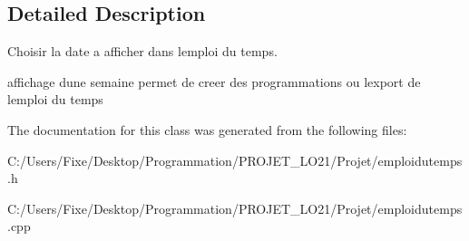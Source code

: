 \subsection{Detailed Description}
Choisir la date a afficher dans l\textquotesingle{}emploi du temps. 

affichage d\textquotesingle{}une semaine permet de creer des programmations ou l\textquotesingle{}export de l\textquotesingle{}emploi du temps 

The documentation for this class was generated from the following files\+:\begin{DoxyCompactItemize}
\item 
C\+:/\+Users/\+Fixe/\+Desktop/\+Programmation/\+P\+R\+O\+J\+E\+T\+\_\+\+L\+O21/\+Projet/emploidutemps.\+h\item 
C\+:/\+Users/\+Fixe/\+Desktop/\+Programmation/\+P\+R\+O\+J\+E\+T\+\_\+\+L\+O21/\+Projet/emploidutemps.\+cpp\end{DoxyCompactItemize}

